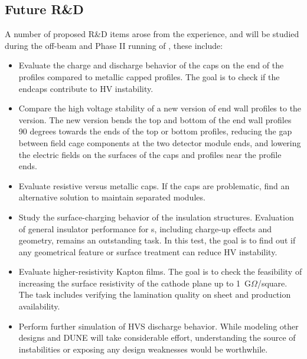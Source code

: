\subsection{Future R\&D}
\label{sec:fdsp-hv-protodune-RD}

A number of proposed R\&D items arose from the  experience, and will be studied during the off-beam and Phase II running of ,  these include:
\begin{itemize}
\item Evaluate the charge and discharge behavior of the  caps on the end of the profiles compared to metallic capped profiles.  The goal is to check if the endcaps contribute to HV instability. 
\item Compare the high voltage stability of a new version of end wall profiles to the  version.  The new version bends the top and bottom of the end wall profiles 90 degrees towards the ends of the top or bottom profiles, reducing the gap between field cage components at the two detector module ends, and lowering the electric fields on the surfaces of the  caps and profiles near the profile ends.
\item Evaluate resistive versus metallic caps.  If the  caps are %
problematic, find an alternative solution to maintain separated  modules.
\item Study the surface-charging behavior of the  insulation structures.  Evaluation of general insulator performance for \lartpc{}s, including charge-up effects and geometry, remains an outstanding task.  In this test, the goal is to find out if any geometrical feature or surface treatment can reduce HV instability.
\item Evaluate higher-resistivity Kapton films.  The goal is to check the feasibility of increasing the surface resistivity of the cathode plane up to 1~G$\Omega$/square.  The task includes verifying the lamination quality on \frfour sheet and production availability.
\item Perform further simulation of  HVS discharge behavior.   While modeling other  designs and DUNE will take considerable effort, %
understanding the source of instabilities or exposing any design weaknesses would be worthwhile. %
\end{itemize}

